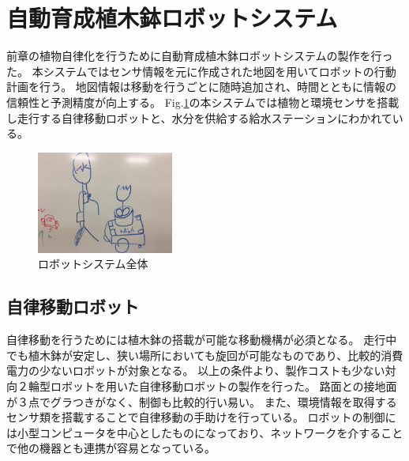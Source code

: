 \documentclass[10pt]{jsarticle}
\begin{document}
\section{自動育成植木鉢ロボットシステム}
前章の植物自律化を行うために自動育成植木鉢ロボットシステムの製作を行った。
本システムではセンサ情報を元に作成された地図を用いてロボットの行動計画を行う。
地図情報は移動を行うごとに随時追加され、時間とともに情報の信頼性と予測精度が向上する。
Fig.\ref{robot_all}の本システムでは植物と環境センサを搭載し走行する自律移動ロボットと、水分を供給する給水ステーションにわかれている。
\begin{figure}[ht]
    \centering
    \includegraphics[width=0.4\textwidth]{img/IMG_3894.JPG}
    \caption{ロボットシステム全体}
    \label{robot_all}
\end{figure}
\subsection{自律移動ロボット}
自律移動を行うためには植木鉢の搭載が可能な移動機構が必須となる。
走行中でも植木鉢が安定し、狭い場所においても旋回が可能なものであり、比較的消費電力の少ないロボットが対象となる。
以上の条件より、製作コストも少ない対向２輪型ロボットを用いた自律移動ロボットの製作を行った。
路面との接地面が３点でグラつきがなく、制御も比較的行い易い。
また、環境情報を取得するセンサ類を搭載することで自律移動の手助けを行っている。
ロボットの制御には小型コンピュータを中心としたものになっており、ネットワークを介することで他の機器とも連携が容易となっている。
\end{document}
